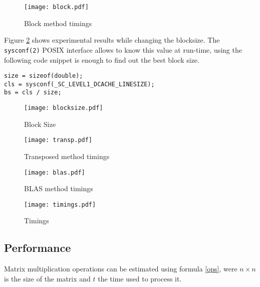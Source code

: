 \documentclass[a4paper,twocolumn]{article}
\begin{document}
\begin{center}
  \begin{figure}[H]
    \texttt{[image: block.pdf]}
    \caption{Block method timings}
    \label{block-timings}
  \end{figure}
\end{center}

Figure \ref{blocksize} shows experimental results while changing the blocksize.
The {\tt sysconf(2)} POSIX interface allows to know this value at run-time,
using the following code snippet is enough to find out the best block size.

\begin{verbatim}
size = sizeof(double);
cls = sysconf(_SC_LEVEL1_DCACHE_LINESIZE);
bs = cls / size;
\end{verbatim}

\begin{center}
  \begin{figure}[H]
    \texttt{[image: blocksize.pdf]}
    \caption{Block Size}
    \label{blocksize}
  \end{figure}
\end{center}

\begin{center}
  \begin{figure}[H]
    \texttt{[image: transp.pdf]}
    \caption{Transposed method timings}
    \label{transp-timings}
  \end{figure}
\end{center}

\begin{center}
  \begin{figure}[H]
    \texttt{[image: blas.pdf]}
    \caption{BLAS method timings}
    \label{blas-timings}
  \end{figure}
\end{center}

\begin{center}
  \begin{figure}[H]
    \texttt{[image: timings.pdf]}
    \caption{Timings}
    \label{timings}
  \end{figure}
\end{center}

\subsection{Performance}

Matrix multiplication operations can be estimated using formula
\ref{ops}, were $ n \times n $ is the size of the matrix and $ t $ the time 
used to process it.
\end{document}
